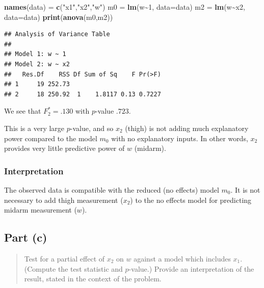 \documentclass[
]{article}
\newenvironment{Shaded}{\begin{snugshade}}{\end{snugshade}}
\newcommand{\AttributeTok}[1]{\textcolor[rgb]{0.13,0.29,0.53}{#1}}
\newcommand{\DecValTok}[1]{\textcolor[rgb]{0.00,0.00,0.81}{#1}}
\newcommand{\FunctionTok}[1]{\textcolor[rgb]{0.13,0.29,0.53}{\textbf{#1}}}
\newcommand{\NormalTok}[1]{#1}
\newcommand{\OtherTok}[1]{\textcolor[rgb]{0.56,0.35,0.01}{#1}}
\newcommand{\SpecialCharTok}[1]{\textcolor[rgb]{0.81,0.36,0.00}{\textbf{#1}}}
\newcommand{\StringTok}[1]{\textcolor[rgb]{0.31,0.60,0.02}{#1}}
\begin{document}
\begin{Shaded}
\begin{Highlighting}[]
\FunctionTok{names}\NormalTok{(data) }\OtherTok{=} \FunctionTok{c}\NormalTok{(}\StringTok{"x1"}\NormalTok{,}\StringTok{"x2"}\NormalTok{,}\StringTok{"w"}\NormalTok{)}
\NormalTok{m0 }\OtherTok{=} \FunctionTok{lm}\NormalTok{(w}\SpecialCharTok{\textasciitilde{}}\DecValTok{1}\NormalTok{,  }\AttributeTok{data=}\NormalTok{data)}
\NormalTok{m2 }\OtherTok{=} \FunctionTok{lm}\NormalTok{(w}\SpecialCharTok{\textasciitilde{}}\NormalTok{x2, }\AttributeTok{data=}\NormalTok{data)}
\FunctionTok{print}\NormalTok{(}\FunctionTok{anova}\NormalTok{(m0,m2))}
\end{Highlighting}
\end{Shaded}

\begin{verbatim}
## Analysis of Variance Table
## 
## Model 1: w ~ 1
## Model 2: w ~ x2
##   Res.Df    RSS Df Sum of Sq    F Pr(>F)
## 1     19 252.73                         
## 2     18 250.92  1    1.8117 0.13 0.7227
\end{verbatim}

We see that \(F^*_2 = .130\) with \(p\)-value \(.723\).

This is a very large \(p\)-value, and so \(x_2\) (thigh) is not adding
much explanatory power compared to the model \(m_0\) with no explanatory
inputs. In other words, \(x_2\) provides very little predictive power of
\(w\) (midarm).

\hypertarget{interpretation}{%
\subsubsection{Interpretation}\label{interpretation}}

The observed data is compatible with the reduced (no effects) model
\(m_0\). It is not necessary to add thigh measurement (\(x_2\)) to the
no effects model for predicting midarm measurement (\(w\)).

\hypertarget{part-c}{%
\subsection{Part (c)}\label{part-c}}

\begin{quote}
Test for a partial effect of \(x_2\) on \(w\) against a model which
includes \(x_1\). (Compute the test statistic and \(p\)-value.) Provide
an interpretation of the result, stated in the context of the problem.
\end{quote}
\end{document}
